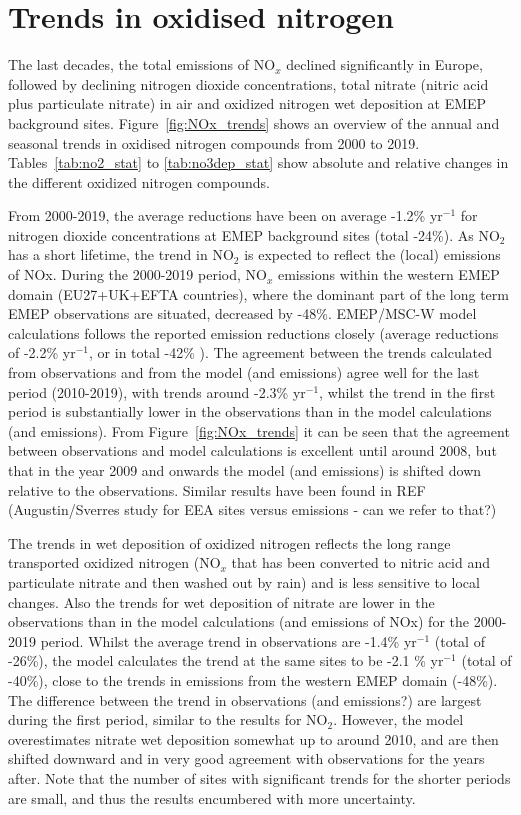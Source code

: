 \section{\label{sec:Trends_oxidised_nitrogen }Trends in oxidised nitrogen}



The last decades, the total emissions of NO$_x$ declined significantly in Europe, followed by declining nitrogen dioxide concentrations, total nitrate (nitric acid plus particulate nitrate) in air and oxidized nitrogen wet deposition at EMEP background sites. 
Figure~\ref{fig:NOx_trends} shows an overview of the annual and seasonal trends in oxidised nitrogen compounds from 2000 to 2019. Tables~\ref{tab:no2_stat} to \ref{tab:no3dep_stat} show absolute and relative changes in the different oxidized nitrogen compounds.

From 2000-2019, the average reductions have been on average -1.2\% yr$^{-1}$ for nitrogen dioxide concentrations at EMEP background sites (total -24\%). As NO$_2$ has a short lifetime, the trend in NO$_2$ is expected to reflect the (local) emissions of NOx. During the 2000-2019 period, NO$_x$ emissions within the western EMEP domain (EU27+UK+EFTA countries), where the dominant part of the long term EMEP observations are situated, decreased by -48\%. EMEP/MSC-W model calculations follows the reported emission reductions closely (average reductions of -2.2\% yr$^{-1}$, or in total -42\% ). 
The agreement between the trends calculated from observations and from the model (and emissions) agree well for the last period (2010-2019), with trends around -2.3\% yr$^{-1}$, whilst the trend in the first period is substantially lower in the observations than in the model calculations (and emissions). From Figure~\ref{fig:NOx_trends} it can be seen that the agreement between observations and model calculations is excellent until around 2008, but that in the year 2009 and onwards the model (and emissions) is shifted down relative to the observations. Similar results have been found in REF (Augustin/Sverres study for EEA sites versus emissions - can we refer to that?)


The trends in wet deposition of oxidized nitrogen reflects the long range transported oxidized nitrogen (NO$_x$ that has been converted to nitric acid and particulate nitrate and then washed out by rain) and is less sensitive to local changes. Also the trends for wet deposition of nitrate are lower in the observations than in the model calculations (and emissions of NOx) for the 2000-2019 period. Whilst the average trend in observations are -1.4\% yr$^{-1}$ (total of -26\%), the model calculates the trend at the same sites to be -2.1 \% yr$^{-1}$ (total of -40\%), close to the trends in emissions from the western EMEP domain (-48\%). The difference between the trend in observations (and emissions?) are largest during the first period, similar to the results for NO$_2$. However, the model overestimates nitrate wet deposition somewhat up to around 2010, and are then shifted downward and in very good agreement with observations for the years after. Note that the number of sites with significant trends for the shorter periods are small, and thus the results encumbered with more uncertainty.

